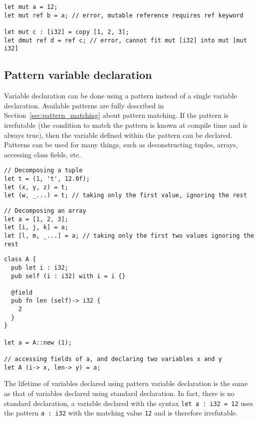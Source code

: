 \begin{lstlisting}[style=coloredverbatim]
let mut a = 12;
let mut ref b = a; // error, mutable reference requires ref keyword

let mut c : [i32] = copy [1, 2, 3];
let dmut ref d = ref c; // error, cannot fit mut [i32] into mut [mut i32]
\end{lstlisting}


\subsection{Pattern variable declaration}

Variable declaration can be done using a pattern instead of a single variable
declaration. Available patterns are fully described in
Section~\ref{sec:pattern_matching} about pattern matching. If the pattern is
irrefutable (the condition to match the pattern is known at compile time and is
always true), then the variable defined within the pattern can be declared.
Patterns can be used for many things, such as deconstructing tuples, arrays,
accessing class fields, etc.
\begin{lstlisting}[style=coloredverbatim]
// Decomposing a tuple
let t = (1, 't', 12.0f);
let (x, y, z) = t;
let (w, _...) = t; // taking only the first value, ignoring the rest
\end{lstlisting}

\begin{lstlisting}[style=coloredverbatim]
// Decomposing an array
let a = [1, 2, 3];
let [i, j, k] = a;
let [l, m, _...] = a; // taking only the first two values ignoring the rest
\end{lstlisting}

\begin{lstlisting}[style=coloredverbatim]
class A {
  pub let i : i32;
  pub self (i : i32) with i = i {}

  @field
  pub fn len (self)-> i32 {
    2
  }
}

let a = A::new (1);

// accessing fields of a, and declaring two variables x and y
let A (i-> x, len-> y) = a;
\end{lstlisting}

The lifetime of variables declared using pattern variable declaration is the
same as that of variables declared using standard declaration. In fact, there is
no standard declaration, a variable declared with the syntax \texttt{let a : i32
  = 12} uses the pattern \texttt{a : i32} with the matching value \texttt{12}
and is therefore irrefutable.

